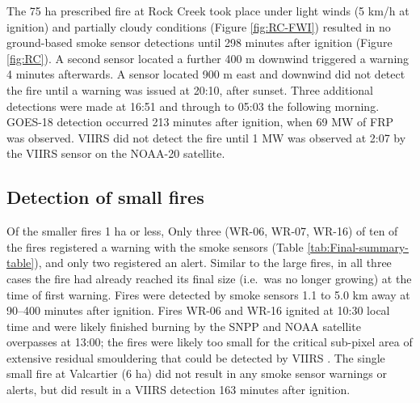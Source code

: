 \documentclass[fire,article,submit,moreauthors]{mdpi}
\begin{document}
The 75 ha prescribed fire at Rock Creek took place under light winds (5
km/h at ignition) and partially cloudy conditions (Figure
\ref{fig:RC-FWI}) resulted in no ground-based smoke sensor detections
until 298 minutes after ignition (Figure \ref{fig:RC}). A second sensor
located a further 400 m downwind triggered a warning 4 minutes
afterwards. A sensor located 900 m east and downwind did not detect the
fire until a warning was issued at 20:10, after sunset. Three additional
detections were made at 16:51 and through to 05:03 the following
morning. GOES-18 detection occurred 213 minutes after ignition, when 69
MW of FRP was observed. VIIRS did not detect the fire until 1 MW was
observed at 2:07 by the VIIRS sensor on the NOAA-20 satellite.

\subsection{Detection of small fires}\label{detection-of-small-fires}

Of the smaller fires 1 ha or less, Only three (WR-06, WR-07, WR-16) of
ten of the fires registered a warning with the smoke sensors (Table
\ref{tab:Final-summary-table}), and only two registered an alert.
Similar to the large fires, in all three cases the fire had already
reached its final size (i.e.~was no longer growing) at the time of first
warning. Fires were detected by smoke sensors 1.1 to 5.0 km away at
90--400 minutes after ignition. Fires WR-06 and WR-16 ignited at 10:30
local time and were likely finished burning by the SNPP and NOAA
satellite overpasses at 13:00; the fires were likely too small for the
critical sub-pixel area of extensive residual smouldering that could be
detected by VIIRS \citep{johnstonSatelliteDetectionLimitations2018}. The
single small fire at Valcartier (6 ha) did not result in any smoke
sensor warnings or alerts, but did result in a VIIRS detection 163
minutes after ignition.
\end{document}
